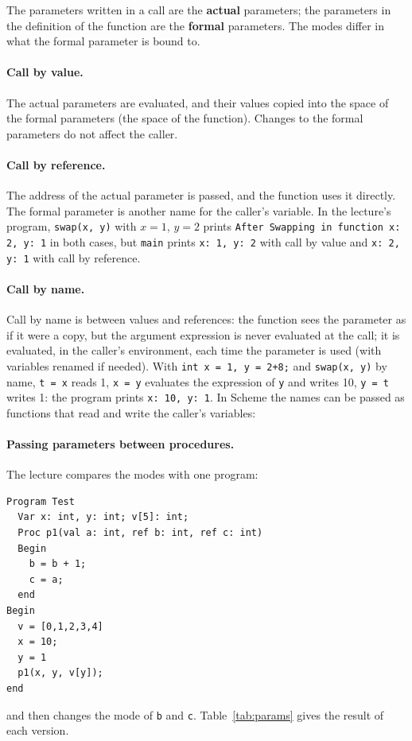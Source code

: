 The parameters written in a call are the \textbf{actual} parameters; the
parameters in the definition of the function are the \textbf{formal}
parameters. The modes differ in what the formal parameter is bound to.

\paragraph{Call by value.} The actual parameters are evaluated, and their
values copied into the space of the formal parameters (the space of the
function). Changes to the formal parameters do not affect the caller.

\paragraph{Call by reference.} The address of the actual parameter is passed,
and the function uses it directly. The formal parameter is another name for
the caller's variable.
In the lecture's program, \texttt{swap(x, y)} with $x = 1$, $y = 2$ prints
\texttt{After Swapping in function x: 2, y: 1} in both cases, but
\texttt{main} prints \texttt{x: 1, y: 2} with call by value and
\texttt{x: 2, y: 1} with call by reference.

\paragraph{Call by name.} Call by name is between values and references: the
function sees the parameter as if it were a copy, but the argument expression
is never evaluated at the call; it is evaluated, in the caller's environment,
each time the parameter is used (with variables renamed if needed). With
\texttt{int x = 1, y = 2+8;} and \texttt{swap(x, y)} by name, \texttt{t = x} reads
1, \texttt{x = y} evaluates the expression of \texttt{y} and writes 10,
\texttt{y = t} writes 1: the program prints \texttt{x: 10, y: 1}. In Scheme the
names can be passed as functions that read and write the caller's variables:

\paragraph{Passing parameters between procedures.} The lecture compares the
modes with one program:
\begin{lstlisting}
Program Test
  Var x: int, y: int; v[5]: int;
  Proc p1(val a: int, ref b: int, ref c: int)
  Begin
    b = b + 1;
    c = a;
  end
Begin
  v = [0,1,2,3,4]
  x = 10;
  y = 1
  p1(x, y, v[y]);
end
\end{lstlisting}
and then changes the mode of \texttt{b} and \texttt{c}. Table~\ref{tab:params}
gives the result of each version.

